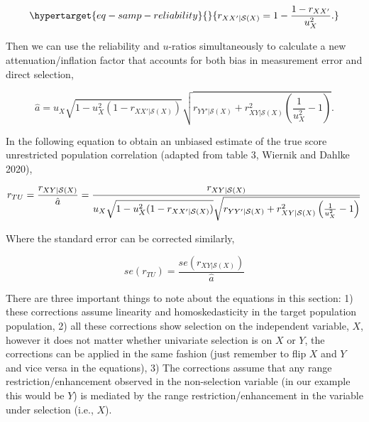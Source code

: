 \documentclass[
  letterpaper,
  DIV=11,
  numbers=noendperiod]{scrreprt}
\begin{document}
\begin{equation}\protect\hypertarget{eq-samp-reliability}{}{
r_{XX'|\mathcal{S}(X)} = 1-\frac{1-r_{XX'}}{u^2_X}.
}\label{eq-samp-reliability}\end{equation}

Then we can use the reliability and \(u\)-ratios simultaneously to
calculate a new attenuation/inflation factor that accounts for both bias
in measurement error and direct selection,

\[
\hat{a} = u_X\sqrt{1-u_X^2(1-r_{XX'|\mathcal{S}(X)})}\sqrt{r_{YY'|\mathcal{S}(X)}+r_{XY|\mathcal{S}(X)}^2\left(\frac{1}{u^2_X}-1\right)}.
\]

In the following equation to obtain an unbiased estimate of the true
score unrestricted population correlation (adapted from table 3, Wiernik
and Dahlke 2020),

\[
\small{r_{TU}=\frac{r_{XY|\mathcal{S}(X)}}{\hat{a}} =\frac{r_{XY|\mathcal{S}(X)}}{u_X\sqrt{1-u_X^2(1-r_{XX'|\mathcal{S}(X)})}\sqrt{r_{YY'|\mathcal{S}(X)}+r_{XY|\mathcal{S}(X)}^2\left(\frac{1}{u^2_X}-1\right)}}}
\]

Where the standard error can be corrected similarly,

\[
se(r_{TU}) = \frac{se(r_{XY|\mathcal{S}(X)})}{\hat{a}}
\]

There are three important things to note about the equations in this
section: 1) these corrections assume linearity and homoskedasticity in
the target population population, 2) all these corrections show
selection on the independent variable, \(X\), however it does not matter
whether univariate selection is on \(X\) or \(Y\), the corrections can
be applied in the same fashion (just remember to flip \(X\) and \(Y\)
and vice versa in the equations), 3) The corrections assume that any
range restriction/enhancement observed in the non-selection variable (in
our example this would be \(Y\)) is mediated by the range
restriction/enhancement in the variable under selection (i.e., \(X\)).
\end{document}
